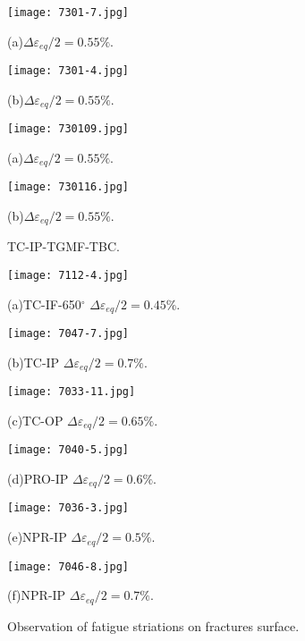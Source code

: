 \begin{figure}
  \begin{minipage}[t]{0.5\linewidth}
  \nonumber
    \centering
    \texttt{[image: 7301-7.jpg]}
    \centerline{(a)$\Delta \varepsilon_{eq}/2=0.55\%$.}
  \end{minipage}%
  \begin{minipage}[t]{0.5\linewidth}
    \centering
    \texttt{[image: 7301-4.jpg]}
    \centerline{(b)$\Delta \varepsilon_{eq}/2=0.55\%$.}
  \end{minipage}

  \begin{minipage}[t]{0.5\linewidth}
  \nonumber
    \centering
    \texttt{[image: 730109.jpg]}
    \centerline{(a)$\Delta \varepsilon_{eq}/2=0.55\%$.}
  \end{minipage}%
  \begin{minipage}[t]{0.5\linewidth}
    \centering
    \texttt{[image: 730116.jpg]}
    \centerline{(b)$\Delta \varepsilon_{eq}/2=0.55\%$.}
  \end{minipage}

  \caption{TC-IP-TGMF-TBC.}
  \label{Fig:MicrostructureofInconel718}
\end{figure}

\begin{figure}
  \begin{minipage}[t]{0.5\linewidth}
  \nonumber
    \centering
    \texttt{[image: 7112-4.jpg]}
    \centerline{(a)TC-IF-650$^{\circ}$ $\Delta \varepsilon_{eq}/2=0.45\%$.}
  \end{minipage}%
  \begin{minipage}[t]{0.5\linewidth}
    \centering
    \texttt{[image: 7047-7.jpg]}
    \centerline{(b)TC-IP $\Delta \varepsilon_{eq}/2=0.7\%$.}
  \end{minipage}

  \begin{minipage}[t]{0.5\linewidth}
  \nonumber
    \centering
    \texttt{[image: 7033-11.jpg]}
    \centerline{(c)TC-OP $\Delta \varepsilon_{eq}/2=0.65\%$.}
  \end{minipage}%
  \begin{minipage}[t]{0.5\linewidth}
    \centering
    \texttt{[image: 7040-5.jpg]}
    \centerline{(d)PRO-IP $\Delta \varepsilon_{eq}/2=0.6\%$.}
  \end{minipage}

  \begin{minipage}[t]{0.5\linewidth}
    \centering
    \texttt{[image: 7036-3.jpg]}
    \centerline{(e)NPR-IP $\Delta \varepsilon_{eq}/2=0.5\%$.}
  \end{minipage}%
  \begin{minipage}[t]{0.5\linewidth}
    \centering
    \texttt{[image: 7046-8.jpg]}
    \centerline{(f)NPR-IP $\Delta \varepsilon_{eq}/2=0.7\%$.}
  \end{minipage}
  \caption{Observation of fatigue striations on fractures surface.}
  \label{Fig:MicrostructureofInconel718}
\end{figure}

